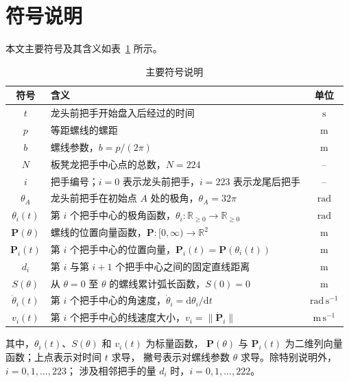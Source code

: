 \documentclass[UTF8,fontset=windows,a4paper,12pt]{ctexart}
\begin{document}
\clearpage
\section{符号说明}

本文主要符号及其含义如表~\ref{tab:symbols} 所示。

\begin{table}[H]
  \centering
  \caption{主要符号说明}
  \label{tab:symbols}
  \begin{tabular}{cp{}c}
    \toprule
    符号 & 含义 & 单位 \\
    \midrule
    $t$ & 龙头前把手开始盘入后经过的时间 & $\mathrm{s}$ \\
    $p$ & 等距螺线的螺距 & $\mathrm{m}$ \\
    $b$ & 螺线参数，$b=p/(2\pi)$ & $\mathrm{m}$ \\
    $N$ & 板凳龙把手中心点的总数，$N=224$ & -- \\
    $i$ & 把手编号；$i=0$ 表示龙头前把手，$i=223$ 表示龙尾后把手 & -- \\
    $\theta_A$ & 龙头前把手在初始点 $A$ 处的极角，$\theta_A=32\pi$ & $\mathrm{rad}$ \\
    $\theta_i(t)$ & 第 $i$ 个把手中心的极角函数，$\theta_i:\mathbb{R}_{\geq0}\to\mathbb{R}_{\geq0}$ & $\mathrm{rad}$ \\
    $\bm P(\theta)$ & 螺线的位置向量函数，$\bm P:[0,\infty)\to\mathbb{R}^2$ & $\mathrm{m}$ \\
    $\bm P_i(t)$ & 第 $i$ 个把手中心的位置向量，$\bm P_i(t)=\bm P\!\left(\theta_i(t)\right)$ & $\mathrm{m}$ \\
    $d_i$ & 第 $i$ 与第 $i+1$ 个把手中心之间的固定直线距离 & $\mathrm{m}$ \\
    $S(\theta)$ & 从 $\theta=0$ 至 $\theta$ 的螺线累计弧长函数，$S(0)=0$ & $\mathrm{m}$ \\
    $\dot\theta_i(t)$ & 第 $i$ 个把手中心的角速度，$\dot\theta_i=\mathrm{d}\theta_i/\mathrm{d}t$ & $\mathrm{rad}\,\mathrm{s}^{-1}$ \\
    $v_i(t)$ & 第 $i$ 个把手中心的线速度大小，$v_i=\|\dot{\bm P}_i\|$ & $\mathrm{m}\,\mathrm{s}^{-1}$ \\
    \bottomrule
  \end{tabular}
\end{table}

其中，$\theta_i(t)$、$S(\theta)$ 和 $v_i(t)$ 为标量函数，
$\bm P(\theta)$ 与 $\bm P_i(t)$ 为二维列向量函数；上点表示对时间 $t$ 求导，
撇号表示对螺线参数 $\theta$ 求导。除特别说明外，$i=0,1,\ldots,223$；
涉及相邻把手的量 $d_i$ 时，$i=0,1,\ldots,222$。
\end{document}
